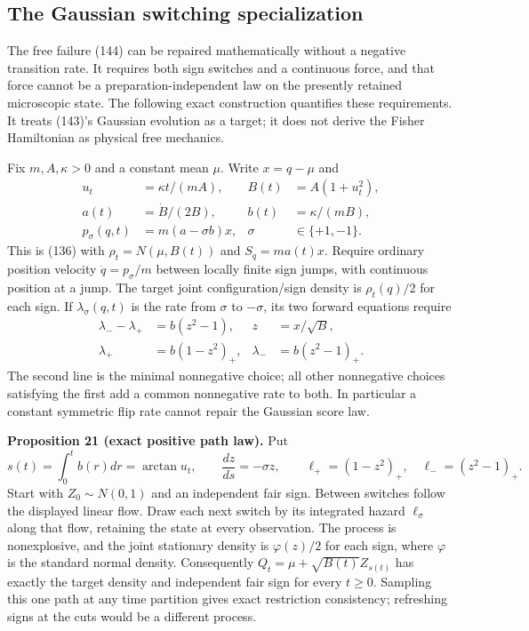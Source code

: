 \documentclass[11pt,a4paper]{article}
\begin{document}
\hypertarget{the-gaussian-switching-specialization}{%
\subsection{The Gaussian switching
specialization}\label{the-gaussian-switching-specialization}}

The free failure (144) can be repaired mathematically without a negative
transition rate. It requires both sign switches and a continuous force,
and that force cannot be a preparation-independent law on the presently
retained microscopic state. The following exact construction quantifies
these requirements. It treats (143)'s Gaussian evolution as a target; it
does not derive the Fisher Hamiltonian as physical free mechanics.

Fix \(m,A,\kappa>0\) and a constant mean \(\mu\). Write \(x=q-\mu\) and
\[\begin{aligned}
u_t&=\kappa t/(mA),&B(t)&=A(1+u_t^2),\\
a(t)&=\dot B/(2B),&b(t)&=\kappa/(mB),\\
p_\sigma(q,t)&=m(a-\sigma b)x,&\sigma&\in\{+1,-1\}.
\end{aligned}\tag{145}\] This is (136) with \(\rho_t=N(\mu,B(t))\) and
\(S_q=ma(t)x\). Require ordinary position velocity \(\dot q=p_\sigma/m\)
between locally finite sign jumps, with continuous position at a jump.
The target joint configuration/sign density is \(\rho_t(q)/2\) for each
sign. If \(\lambda_\sigma(q,t)\) is the rate from \(\sigma\) to
\(-\sigma\), its two forward equations require \[\begin{aligned}
\lambda_--\lambda_+&=b(z^2-1),&z&=x/\sqrt B,\\
\lambda_+&=b(1-z^2)_+,&\lambda_-&=b(z^2-1)_+.
\end{aligned}\tag{146}\] The second line is the minimal nonnegative
choice; all other nonnegative choices satisfying the first add a common
nonnegative rate to both. In particular a constant symmetric flip rate
cannot repair the Gaussian score law.

\textbf{Proposition 21 (exact positive path law).} Put
\[s(t)=\int_0^t b(r)dr=\arctan u_t,\qquad
\frac{dz}{ds}=-\sigma z,\qquad
\ell_+=(1-z^2)_+,\quad\ell_-=(z^2-1)_+.\tag{147}\] Start with
\(Z_0\sim N(0,1)\) and an independent fair sign. Between switches follow
the displayed linear flow. Draw each next switch by its integrated
hazard \(\ell_\sigma\) along that flow, retaining the state at every
observation. The process is nonexplosive, and the joint stationary
density is \(\varphi(z)/2\) for each sign, where \(\varphi\) is the
standard normal density. Consequently \(Q_t=\mu+\sqrt{B(t)}Z_{s(t)}\)
has exactly the target density and independent fair sign for every
\(t\ge0\). Sampling this one path at any time partition gives exact
restriction consistency; refreshing signs at the cuts would be a
different process.
\end{document}
